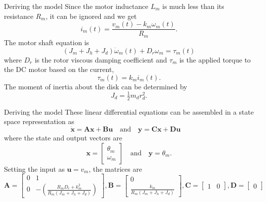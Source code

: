 \documentclass[9pt]{beamer-control}
\begin{document}
\begin{frame}{Deriving the model}
Since the motor inductance $L_m$ is much less than its resistance $R_m$, it can be ignored and we get
\begin{equation}
	i_m(t) = \frac{v_m(t) - k_m \omega_m (t)}{R_m} .
\end{equation}
The motor shaft equation is
\begin{equation}
	(J_m+J_h+J_d)\dot{\omega}_m (t) + D_r \omega _m = \tau_m(t)
\end{equation}
where $D_r$ is the rotor viscous damping coefficient and $\tau_m$ is the applied torque to the DC motor based on the current,
\begin{equation}
	\tau_m(t) = k_m i_m (t).
\end{equation}
The moment of inertia about the disk can be determined by
\begin{equation}
	J_d = \tfrac{1}{2} m_d r_d^2.
\end{equation}
\end{frame}


\begin{frame}{Deriving the model}
These linear differential equations can be assembled in a state space representation as
\begin{equation}
	\dot{\mathbf{x}} =\mathbf{A}\mathbf{x} + \mathbf{B} \mathbf{u} \quad \text{and} \quad \mathbf{y} =\mathbf{C}\mathbf{x} + \mathbf{D} \mathbf{u} \quad
\end{equation}
where the state and output vectors are
\begin{equation}
	\mathbf{x} = \begin{bmatrix}
	\theta_m \\ \omega_m
	\end{bmatrix}
	\quad \text{and} \quad \mathbf{y} = \theta_m .
\end{equation}
Setting the input as $\mathbf{u}=v_m$, the matrices are
\begin{equation}
	\mathbf{A}=\begin{bmatrix}
		0 & 1 \\
		0 & -\left(\tfrac{R_m D_r + k_m^2}{R_m(J_m+J_h+J_d)}\right)
	\end{bmatrix},
	\mathbf{B} = \begin{bmatrix}
		0 \\ \tfrac{k_m}{R_m(J_m+J_h+J_d)}
	\end{bmatrix},
	\mathbf{C} = \begin{bmatrix}
		1 & 0
	\end{bmatrix},
	\mathbf{D} = \begin{bmatrix}
		0
	\end{bmatrix}
\end{equation}
\end{frame}
\end{document}
